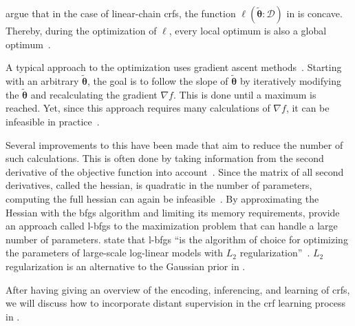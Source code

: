 \citet{sutton2010introduction} argue that in the case of \glspl{linear-chain crf}, the function $\ell(\bm{\tilde{\theta}}:\mathcal{D})$ in  is concave.
Thereby, during the optimization of $\ell$, every local optimum is also a global optimum~\citep{sutton2010introduction}.

\bigskip

A typical approach to the optimization uses gradient ascent methods~\citep{koller2009probabilistic}.
Starting with an arbitrary $\bm{\tilde{\theta}}$, the goal is to follow the slope of $\bm{\tilde{\theta}}$ by iteratively modifying the $\bm{\tilde{\theta}}$ and recalculating the gradient $\nabla f$.
This is done until a maximum is reached.
Yet, since this approach requires many calculations of $\nabla f$, it can be infeasible in practice~\citep{sutton2010introduction}.

Several improvements to this have been made that aim to reduce the number of such calculations.
This is often done by taking information from the second derivative of the \gls{objective function} into account~\citep{sutton2010introduction}.
Since the matrix of all second derivatives, called the \gls{hessian}, is quadratic in the number of parameters, computing the full \gls{hessian} can again be infeasible~\citep{sutton2010introduction}.
By approximating the Hessian with the \gls{bfgs} algorithm and limiting its memory requirements, \citet{byrd1994representations} provide an approach called \gls{l-bfgs} to the maximization problem that can handle a large number of parameters.
\citet{andrew2007scalable} state that \gls{l-bfgs} ``is the algorithm of choice for optimizing the parameters of large-scale log-linear models with $L_2$ regularization''~\citep{andrew2007scalable}.
$L_2$ regularization is an alternative to the Gaussian prior in .

\bigskip

After having giving an overview of the encoding, inferencing, and learning of \glspl{crf}, we will discuss how to incorporate \gls{distant supervision} in the \gls{crf} learning process in .

